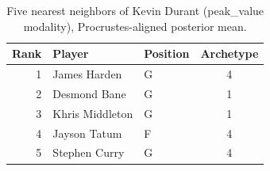 \begin{table}[htbp]
  \centering\small
  \begin{tabular}{rllc}
    \toprule
    Rank & Player & Position & Archetype \\
    \midrule
    1 & James Harden & G & 4 \\
    2 & Desmond Bane & G & 1 \\
    3 & Khris Middleton & G & 1 \\
    4 & Jayson Tatum & F & 4 \\
    5 & Stephen Curry & G & 4 \\
    \bottomrule
  \end{tabular}
  \caption{Five nearest neighbors of Kevin Durant (peak_value modality), Procrustes-aligned posterior mean.}
  \label{tab:Kevin_Durant_neighbors_peak_value}
\end{table}

